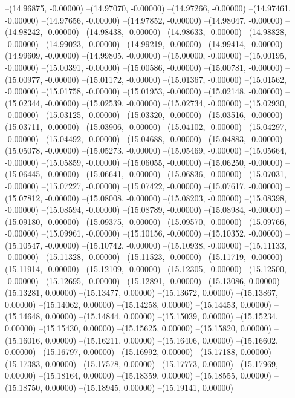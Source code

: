 --(14.96875, -0.00000)
--(14.97070, -0.00000)
--(14.97266, -0.00000)
--(14.97461, -0.00000)
--(14.97656, -0.00000)
--(14.97852, -0.00000)
--(14.98047, -0.00000)
--(14.98242, -0.00000)
--(14.98438, -0.00000)
--(14.98633, -0.00000)
--(14.98828, -0.00000)
--(14.99023, -0.00000)
--(14.99219, -0.00000)
--(14.99414, -0.00000)
--(14.99609, -0.00000)
--(14.99805, -0.00000)
--(15.00000, -0.00000)
--(15.00195, -0.00000)
--(15.00391, -0.00000)
--(15.00586, -0.00000)
--(15.00781, -0.00000)
--(15.00977, -0.00000)
--(15.01172, -0.00000)
--(15.01367, -0.00000)
--(15.01562, -0.00000)
--(15.01758, -0.00000)
--(15.01953, -0.00000)
--(15.02148, -0.00000)
--(15.02344, -0.00000)
--(15.02539, -0.00000)
--(15.02734, -0.00000)
--(15.02930, -0.00000)
--(15.03125, -0.00000)
--(15.03320, -0.00000)
--(15.03516, -0.00000)
--(15.03711, -0.00000)
--(15.03906, -0.00000)
--(15.04102, -0.00000)
--(15.04297, -0.00000)
--(15.04492, -0.00000)
--(15.04688, -0.00000)
--(15.04883, -0.00000)
--(15.05078, -0.00000)
--(15.05273, -0.00000)
--(15.05469, -0.00000)
--(15.05664, -0.00000)
--(15.05859, -0.00000)
--(15.06055, -0.00000)
--(15.06250, -0.00000)
--(15.06445, -0.00000)
--(15.06641, -0.00000)
--(15.06836, -0.00000)
--(15.07031, -0.00000)
--(15.07227, -0.00000)
--(15.07422, -0.00000)
--(15.07617, -0.00000)
--(15.07812, -0.00000)
--(15.08008, -0.00000)
--(15.08203, -0.00000)
--(15.08398, -0.00000)
--(15.08594, -0.00000)
--(15.08789, -0.00000)
--(15.08984, -0.00000)
--(15.09180, -0.00000)
--(15.09375, -0.00000)
--(15.09570, -0.00000)
--(15.09766, -0.00000)
--(15.09961, -0.00000)
--(15.10156, -0.00000)
--(15.10352, -0.00000)
--(15.10547, -0.00000)
--(15.10742, -0.00000)
--(15.10938, -0.00000)
--(15.11133, -0.00000)
--(15.11328, -0.00000)
--(15.11523, -0.00000)
--(15.11719, -0.00000)
--(15.11914, -0.00000)
--(15.12109, -0.00000)
--(15.12305, -0.00000)
--(15.12500, -0.00000)
--(15.12695, -0.00000)
--(15.12891, -0.00000)
--(15.13086, 0.00000)
--(15.13281, 0.00000)
--(15.13477, 0.00000)
--(15.13672, 0.00000)
--(15.13867, 0.00000)
--(15.14062, 0.00000)
--(15.14258, 0.00000)
--(15.14453, 0.00000)
--(15.14648, 0.00000)
--(15.14844, 0.00000)
--(15.15039, 0.00000)
--(15.15234, 0.00000)
--(15.15430, 0.00000)
--(15.15625, 0.00000)
--(15.15820, 0.00000)
--(15.16016, 0.00000)
--(15.16211, 0.00000)
--(15.16406, 0.00000)
--(15.16602, 0.00000)
--(15.16797, 0.00000)
--(15.16992, 0.00000)
--(15.17188, 0.00000)
--(15.17383, 0.00000)
--(15.17578, 0.00000)
--(15.17773, 0.00000)
--(15.17969, 0.00000)
--(15.18164, 0.00000)
--(15.18359, 0.00000)
--(15.18555, 0.00000)
--(15.18750, 0.00000)
--(15.18945, 0.00000)
--(15.19141, 0.00000)
